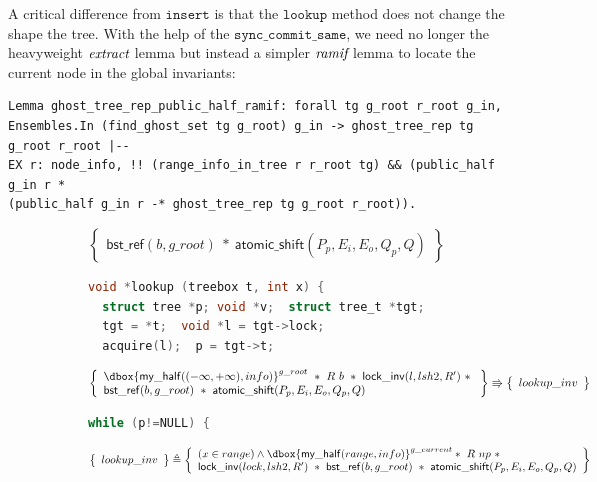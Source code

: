 \documentclass[acmsmall,screen]{acmart}\settopmatter{printfolios=true}
\newcommand\dboxed[1]{\dbox{\ensuremath{#1}}}
\newcommand{\ghost}[2]{\ensuremath{\dboxed{#1}^{#2}}}
\newcommand{\nodeboxrep}{\ensuremath{\mathsf{bst\_ref}}}
\begin{document}
A critical difference from $\texttt{insert}$ is that the $\texttt{lookup}$ method does not change the shape the tree. With the help of the $\texttt{sync\_commit\_same}$, we need no longer the heavyweight $\emph{extract}$ lemma but instead a simpler $\emph{ramif}$ lemma to locate the current node in the global invariants:
\begin{verbatim}
Lemma ghost_tree_rep_public_half_ramif: forall tg g_root r_root g_in,
Ensembles.In (find_ghost_set tg g_root) g_in -> ghost_tree_rep tg g_root r_root |-- 
EX r: node_info, !! (range_info_in_tree r r_root tg) && (public_half g_in r * 
(public_half g_in r -* ghost_tree_rep tg g_root r_root)).
\end{verbatim}

\begin{figure}[htp]
\begin{subfigure}[t]{1\textwidth}
 $$\left\{\begin{array}{l} \nodeboxrep(b,g\_root)\ *\ \mathsf{atomic\_shift}(P_p,E_i,E_o,Q_p,Q)\end{array}\right\}$$
\begin{lstlisting}[language = C,  numbers = none]
void *lookup (treebox t, int x) {
  struct tree *p; void *v;  struct tree_t *tgt;
  tgt = *t;  void *l = tgt->lock;
  acquire(l);  p = tgt->t;
 \end{lstlisting}  
 $$\left\{\begin{array}{l} \ghost{\mathsf{my\_half}((-\infty,+\infty),info)}{g\_root}\ *\ R\ b\ *\ \mathsf{lock\_inv}(l,lsh2,R')\ *\ \\
 \nodeboxrep(b,g\_root)\ *\ \mathsf{atomic\_shift}(P_p,E_i,E_o,Q_p,Q)\end{array}\right\} \Rrightarrow \left\{\begin{array}{l} lookup\_inv \end{array}\right\}$$ 
  \begin{lstlisting}[language = C, numbers = none]
    while (p!=NULL) {
       \end{lstlisting}   
   $$\left\{\begin{array}{l} lookup\_inv \end{array}\right\} \triangleq \left\{\begin{array}{l}(x\in range)\land \ghost{\mathsf{my\_half}(range,info)}{g\_current}*\ R\ np\ *\\\mathsf{lock\_inv}(lock,lsh2,R')\ *\ \nodeboxrep(b,g\_root)\ *\ \mathsf{atomic\_shift}(P_p,E_i,E_o,Q_p,Q)\end{array}\right\}$$
      \begin{lstlisting}[language = C,  numbers = none]

\end{lstlisting}
\end{subfigure}
\end{figure}
\end{document}
